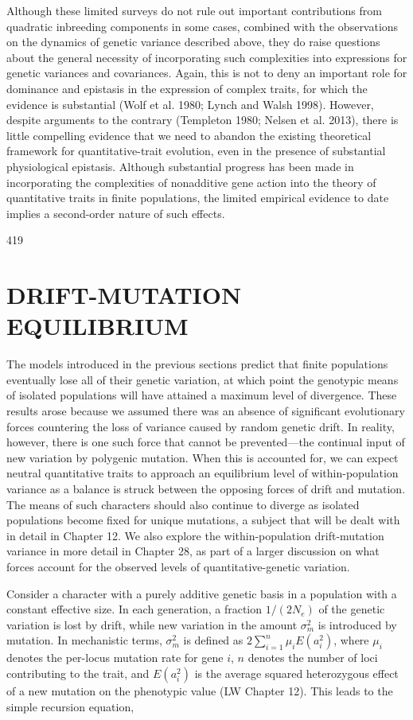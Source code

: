 \documentclass{article}
\begin{document}
Although these limited surveys do not rule out important contributions from quadratic inbreeding components in some cases, combined with the observations on the dynamics of genetic variance described above, they do raise questions about the general necessity of incorporating such complexities into expressions for genetic variances and covariances. Again, this is not to deny an important role for dominance and epistasis in the expression of complex traits, for which the evidence is substantial (Wolf et al. 1980; Lynch and Walsh 1998). However, despite arguments to the contrary (Templeton 1980; Nelsen et al. 2013), there is little compelling evidence that we need to abandon the existing theoretical framework for quantitative-trait evolution, even in the presence of substantial physiological epistasis. Although substantial progress has been made in incorporating the complexities of nonadditive gene action into the theory of quantitative traits in finite populations, the limited empirical evidence to date implies a second-order nature of such effects.

419

\section{DRIFT-MUTATION EQUILIBRIUM}
The models introduced in the previous sections predict that finite populations eventually lose all of their genetic variation, at which point the genotypic means of isolated populations will have attained a maximum level of divergence. These results arose because we assumed there was an absence of significant evolutionary forces countering the loss of variance caused by random genetic drift. In reality, however, there is one such force that cannot be prevented—the continual input of new variation by polygenic mutation. When this is accounted for, we can expect neutral quantitative traits to approach an equilibrium level of within-population variance as a balance is struck between the opposing forces of drift and mutation. The means of such characters should also continue to diverge as isolated populations become fixed for unique mutations, a subject that will be dealt with in detail in Chapter 12. We also explore the within-population drift-mutation variance in more detail in Chapter 28, as part of a larger discussion on what forces account for the observed levels of quantitative-genetic variation.

Consider a character with a purely additive genetic basis in a population with a constant effective size. In each generation, a fraction  $ 1/(2N_e) $ of the genetic variation is lost by drift, while new variation in the amount  $ \sigma_m^2 $ is introduced by mutation. In mechanistic terms,  $ \sigma_m^2 $ is defined as  $ 2 \sum_{i=1}^n \mu_i E(a_i^2) $, where  $ \mu_i $ denotes the per-locus mutation rate for gene  $ i $,  $ n $ denotes the number of loci contributing to the trait, and  $ E(a_i^2) $ is the average squared heterozygous effect of a new mutation on the phenotypic value (LW Chapter 12). This leads to the simple recursion equation,
\end{document}
